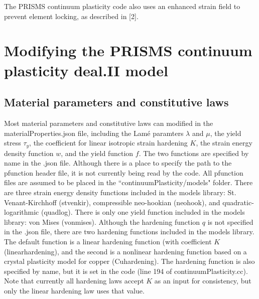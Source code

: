 \documentclass[10pt]{article}
\begin{document}
The PRISMS continuum plasticity code also uses an enhanced strain field to prevent element locking, as described in [2].

\pagebreak

\section{Modifying the PRISMS continuum plasticity deal.II model}

\subsection{Material parameters and constitutive laws}
Most material parameters and constitutive laws can modified in the materialProperties.json file, including the Lam\'e paramters $\lambda$ and $\mu$, the yield stress $\tau_y$, the coefficient for linear isotropic strain hardening $K$, the strain energy density function $w$, and the yield function $f$. The two functions are specified by name in the .json file. Although there is a place to specify the path to the pfunction header file, it is not currently being read by the code. All pfunction files are assumed to be placed in the ``continuumPlasticity/models" folder. There are three strain energy density functions included in the models library: St. Venant-Kirchhoff (stvenkir), compressible neo-hookian (neohook), and quadratic-logarithmic (quadlog). There is only one yield function included in the models library: von Mises (von\textunderscore mises). Although the hardening function $q$ is not specified in the .json file, there are two hardening functions included in the models library. The default function is a linear hardening function (with coefficient $K$ (linear\textunderscore hardening), and the second is a nonlinear hardening function based on a crystal plasticity model for copper (Cu\textunderscore hardening). The hardening function is also specified by name, but it is set in the code (line 194 of continuumPlasticity.cc). Note that currently all hardening laws accept $K$ as an input for consistency, but only the linear hardening law uses that value.
\end{document}
